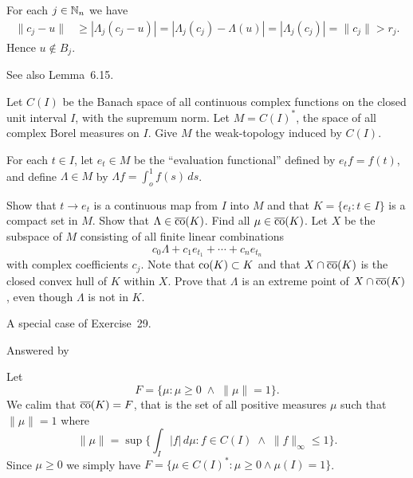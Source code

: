 \begin{enumerate}
For each \(j\in\mathbb{N}_n\) we have
\begin{align*}
\|c_j - u\|
 &\geq |\Lambda_j(c_j - u)|
 = |\Lambda_j(c_j) - \Lambda(u)|
 = |\Lambda_j(c_j)| = \|c_j\| > r_j.
\end{align*}
Hence \(u \notin B_j\).

See also \cite{Fabian2001} Lemma~6.15.




\begin{excopy}
Let \(C(I)\) be the Banach space of all continuous complex functions on
the closed unit interval $I$, with the supremum norm.
Let \(M = C(I)^*\), the space of all complex Borel measures on $I$.
Give $M$ the weak\upstar-topology induced by \(C(I)\).

For each \(t \in I\), let \(e_t \in M\) be the ``evaluation functional''
defined by \(e_t f = f(t)\), and define \(\Lambda \in M\) by
\(\Lambda f = \int_o^1 f(s)\,ds\).
\begin{itemize}
Show that \(t \to e_t\) is a continuous map from $I$ into $M$ 
and that \(K = \{e_t: t\in I\}\) is a compact set in $M$.
 Show that \(\Lambda \in \overline{\mathop{\rm co}\nolimits}(K)\).
 Find all \(\mu \in \overline{\mathop{\rm co}\nolimits}(K)\).
 Let $X$ be the subspace of $M$ consisting of all finite linear 
combinations 
\begin{equation*}
c_0 \Lambda + c_1 e_{t_1} + \cdots + c_n e_{t_n}
\end{equation*}
with complex coefficients \(c_j\). Note that \(\mathop{\rm co}\nolimits(K) \subset K\) and that 
\(X \cap \overline{\mathop{\rm co}\nolimits}(K)\) is the closed convex hull of $K$ 
within $X$. Prove that \(\Lambda\) is an extreme point 
of \(X \cap \overline{\mathop{\rm co}\nolimits}(K)\), even though \(\Lambda\) is not in $K$.
\end{itemize}
\end{excopy}

\begin{itemize}
A special case of Exercise~29.

Answered by 

Let 
\begin{equation*}
F = \{\mu: \mu \geq 0 \;\wedge\; \|\mu\| = 1\}.
\end{equation*}
We calim that  \(\overline{\mathop{\rm co}\nolimits}(K) = F\),
that is the set of all positive measures \(\mu\)
such that \(\|\mu\| = 1\) where
\begin{equation*}
\|\mu\|  = \sup 
  \bigl\{\int_I |f|\,d\mu: f\in C(I) \;\wedge\; \|f\|_\infty \leq 1\bigr\}.
\end{equation*}
Since \(\mu \geq 0\) we simply have
 \(F = \{\mu\in C(I)^*: \mu\geq 0 \wedge \mu(I)=1\}\).


\end{itemize}
\end{enumerate}
